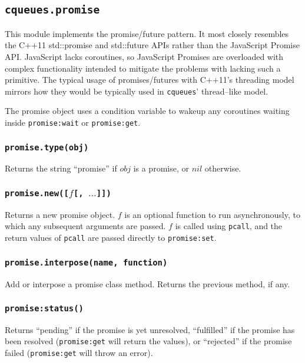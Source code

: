 \documentclass[11pt, oneside]{memoir}
\newcommand*{\cqueues}[0]{\texttt{cqueues}\xspace}
\newcommand*{\fn}[1]{\texttt{#1}\xspace}
\newcounter{toccols}
\newenvironment{Module}[1]{
	\subsection{\texttt{#1}}
	\addtocontents{toc}{
		\protect\begin{multicols}{\value{toccols}}
	}
}{
	\addtocontents{toc}{\protect\end{multicols}}
}
\begin{document}
\begin{Module}{cqueues.promise}

This module implements the promise/future pattern. It most closely resembles the C++11 std::promise and std::future APIs rather than the JavaScript Promise API. JavaScript lacks coroutines, so JavaScript Promises are overloaded with complex functionality intended to mitigate the problems with lacking such a primitive. The typical usage of promises/futures with C++11's threading model mirrors how they would be typically used in \cqueues' thread--like model.

The promise object uses a condition variable to wakeup any coroutines waiting inside \fn{promise:wait} or \fn{promise:get}.

\subsubsection[\fn{promise.type}]{\fn{promise.type(obj)}}

Returns the string ``promise'' if $obj$ is a promise, or $nil$ otherwise.

\subsubsection[\fn{promise.new}]{\fn{promise.new([$f$[, $\ldots$]])}}

Returns a new promise object. $f$ is an optional function to run asynchronously, to which any subsequent arguments are passed. $f$ is called using \fn{pcall}, and the return values of \fn{pcall} are passed directly to \fn{promise:set}.

\subsubsection[\fn{promise.interpose}]{\fn{promise.interpose(name, function)}}

Add or interpose a promise class method. Returns the previous method, if any.

\subsubsection[\fn{promise:status}]{\fn{promise:status()}}

Returns ``pending'' if the promise is yet unresolved, ``fulfilled'' if the promise has been resolved (\fn{promise:get} will return the values), or ``rejected'' if the promise failed (\fn{promise:get} will throw an error).


\end{Module}
\end{document}
